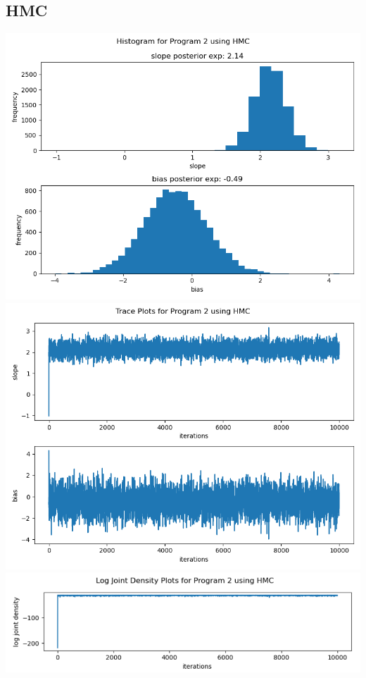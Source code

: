 \documentclass[10pt]{homeworg}
\begin{document}
\subsection{HMC}
\begin{center}
\includegraphics[scale=0.5]{figures/HMC_program_2.png}
\includegraphics[scale=0.5]{figures/trace_HMC_program_2.png}
\includegraphics[scale=0.58]{figures/log_joint_HMC_program_2.png}
\end{center}
\end{document}
